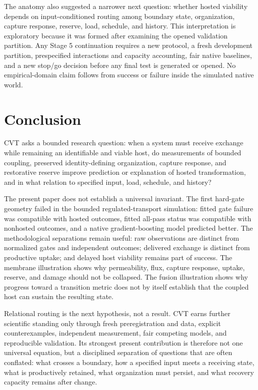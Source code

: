 \documentclass[11pt]{article}
\begin{document}
The anatomy also suggested a narrower next question: whether hosted viability depends on input-conditioned routing among boundary state, organization, capture response, reserve, load, schedule, and history. This interpretation is exploratory because it was formed after examining the opened validation partition. Any Stage 5 continuation requires a new protocol, a fresh development partition, prespecified interactions and capacity accounting, fair native baselines, and a new stop/go decision before any final test is generated or opened. No empirical-domain claim follows from success or failure inside the simulated native world.

\section{Conclusion}
\label{sec:conclusion}

CVT asks a bounded research question: when a system must receive exchange while remaining an identifiable and viable host, do measurements of bounded coupling, preserved identity-defining organization, capture response, and restorative reserve improve prediction or explanation of hosted transformation, and in what relation to specified input, load, schedule, and history?

The present paper does not establish a universal invariant. The first hard-gate geometry failed in the bounded regulated-transport simulation: fitted gate failure was compatible with hosted outcomes, fitted all-pass status was compatible with nonhosted outcomes, and a native gradient-boosting model predicted better. The methodological separations remain useful: raw observations are distinct from normalized gates and independent outcomes; delivered exchange is distinct from productive uptake; and delayed host viability remains part of success. The membrane illustration shows why permeability, flux, capture response, uptake, reserve, and damage should not be collapsed. The fusion illustration shows why progress toward a transition metric does not by itself establish that the coupled host can sustain the resulting state.

Relational routing is the next hypothesis, not a result. CVT earns further scientific standing only through fresh preregistration and data, explicit counterexamples, independent measurement, fair competing models, and reproducible validation. Its strongest present contribution is therefore not one universal equation, but a disciplined separation of questions that are often conflated: what crosses a boundary, how a specified input meets a receiving state, what is productively retained, what organization must persist, and what recovery capacity remains after change.
\end{document}
